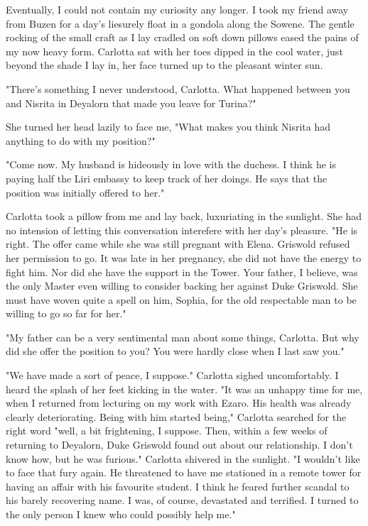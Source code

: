 \documentclass{article}
\begin{document}
Eventually, I could not contain my curiosity any longer. I took my friend away from Buzen for a day's liesurely float in a gondola along the Sowene. The gentle rocking of the small craft as I lay cradled on soft down pillows eased the pains of my now heavy form. Carlotta sat with her toes dipped in the cool water, just beyond the shade I lay in, her face turned up to the pleasant winter sun. 

"There's something I never understood, Carlotta. What happened between you and Nisrita in Deyalorn that made you leave for Turina?"

She turned her head lazily to face me, "What makes you think Nisrita had anything to do with my position?"

"Come now. My husband is hideously in love with the duchess. I think he is paying half the Liri embassy to keep track of her doings. He says that the position was initially offered to her."

Carlotta took a pillow from me and lay back, luxuriating in the sunlight. She had no intension of letting this conversation interefere with her day's pleasure. "He is right. The offer came while she was still pregnant with Elena. Griswold refused her permission to go. It was late in her pregnancy, she did not have the energy to fight him. Nor did she have the support in the Tower. Your father, I believe, was the only Master even willing to consider backing her against Duke Griswold. She must have woven quite a spell on him, Sophia, for the old respectable man to be willing to go so far for her."

"My father can be a very sentimental man about some things, Carlotta. But why did she offer the position to you? You were hardly close when I last saw you."

"We have made a sort of peace, I suppose." Carlotta sighed uncomfortably. I heard the splash of her feet kicking in the water. "It was an unhappy time for me, when I returned from lecturing on my work with Ezaro. His health was already clearly deteriorating. Being with him started being," Carlotta searched for the right word "well, a bit frightening, I suppose. Then, within a few weeks of returning to Deyalorn, Duke Griswold found out about our relationship. I don't know how, but he was furious." Carlotta shivered in the sunlight. "I wouldn't like to face that fury again. He threatened to have me stationed in a remote tower for having an affair with his favourite student. I think he feared further scandal to his barely recovering name. I was, of course, devastated and terrified. I turned to the only person I knew who could possibly help me."
\end{document}
